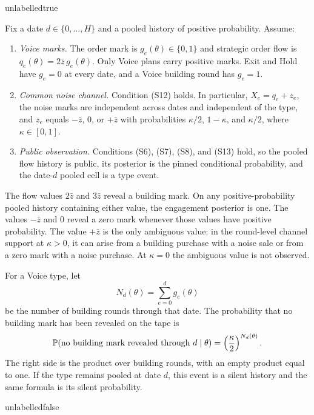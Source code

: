 \csname unlabelledtrue\endcsname
\begin{lemma}[Detection]
\label{lem:detection}
Fix a date $d\in\{0,\ldots,H\}$ and a pooled history of positive probability. Assume:
\begin{enumerate}[label=(D-\arabic*),leftmargin=3.2em,itemsep=3pt]
\item \emph{Voice marks.} The order mark is $g_e(\theta)\in\{0,1\}$ and strategic order flow is
  $q_e(\theta)=2\bar z\,g_e(\theta)$. Only Voice plans carry positive marks. Exit and Hold have
  $g_e=0$ at every date, and a Voice building round has $g_e=1$.
\item \emph{Common noise channel.} Condition (S12) holds. In particular,
  $X_e=q_e+z_e$, the noise marks are independent across dates and independent of the type, and
  $z_e$ equals $-\bar z$, $0$, or $+\bar z$ with probabilities
  $\kappa/2$, $1-\kappa$, and $\kappa/2$, where $\kappa\in[0,1]$.
\item \emph{Public observation.} Conditions (S6), (S7), (S8), and (S13) hold, so the pooled flow
  history is public, its posterior is the pinned conditional probability, and the date-$d$ pooled
  cell is a type event.
\end{enumerate}
The flow values $2\bar z$ and $3\bar z$ reveal a building mark. On any positive-probability
pooled history containing either value, the engagement posterior is one. The values $-\bar z$
and $0$ reveal a zero mark whenever those values have positive probability. The value $+\bar z$
is the only ambiguous value: in the round-level channel support at $\kappa>0$, it can arise from a
building purchase with a noise sale or from a zero mark with a noise purchase. At $\kappa=0$ the
ambiguous value is not observed.

For a Voice type, let
\[
  N_d(\theta)=\sum_{e=0}^{d}g_e(\theta)
\]
be the number of building rounds through that date. The probability that no building mark has
been revealed on the tape is
\begin{equation}
\label{eq:detection-silence}
  \mathbb{P}(\text{no building mark revealed through }d\mid\theta)
  =\left(\frac{\kappa}{2}\right)^{N_d(\theta)}.
\end{equation}
The right side is the product over building rounds, with an empty product equal to one.
If the type remains pooled at date $d$, this event is a silent history and the same formula is its
silent probability.
\end{lemma}
\csname unlabelledfalse\endcsname

